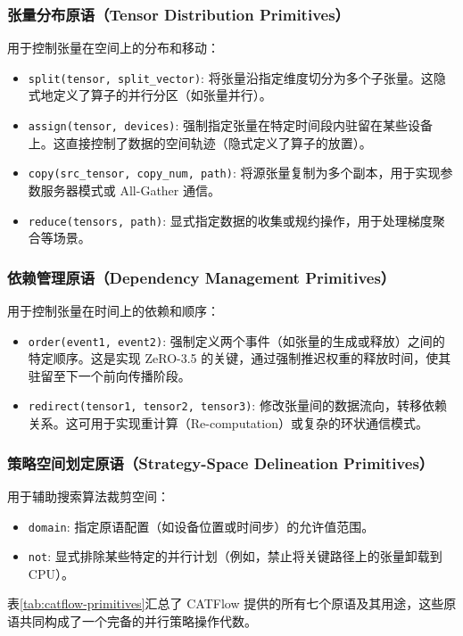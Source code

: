 \subsubsection{张量分布原语（Tensor Distribution Primitives）}
用于控制张量在空间上的分布和移动：
\begin{itemize}
    \item \texttt{split(tensor, split\_vector)}: 将张量沿指定维度切分为多个子张量。这隐式地定义了算子的并行分区（如张量并行）。
    \item \texttt{assign(tensor, devices)}: 强制指定张量在特定时间段内驻留在某些设备上。这直接控制了数据的空间轨迹（隐式定义了算子的放置）。
    \item \texttt{copy(src\_tensor, copy\_num, path)}: 将源张量复制为多个副本，用于实现参数服务器模式或 All-Gather 通信。
    \item \texttt{reduce(tensors, path)}: 显式指定数据的收集或规约操作，用于处理梯度聚合等场景。
\end{itemize}

\subsubsection{依赖管理原语（Dependency Management Primitives）}
用于控制张量在时间上的依赖和顺序：
\begin{itemize}
    \item \texttt{order(event1, event2)}: 强制定义两个事件（如张量的生成或释放）之间的特定顺序。这是实现 ZeRO-3.5 的关键，通过强制推迟权重的释放时间，使其驻留至下一个前向传播阶段。
    \item \texttt{redirect(tensor1, tensor2, tensor3)}: 修改张量间的数据流向，转移依赖关系。这可用于实现重计算（Re-computation）或复杂的环状通信模式。
\end{itemize}

\subsubsection{策略空间划定原语（Strategy-Space Delineation Primitives）}
用于辅助搜索算法裁剪空间：
\begin{itemize}
    \item \texttt{domain}: 指定原语配置（如设备位置或时间步）的允许值范围。
    \item \texttt{not}: 显式排除某些特定的并行计划（例如，禁止将关键路径上的张量卸载到 CPU）。
\end{itemize}

表\ref{tab:catflow-primitives}汇总了 CATFlow 提供的所有七个原语及其用途，这些原语共同构成了一个完备的并行策略操作代数。


